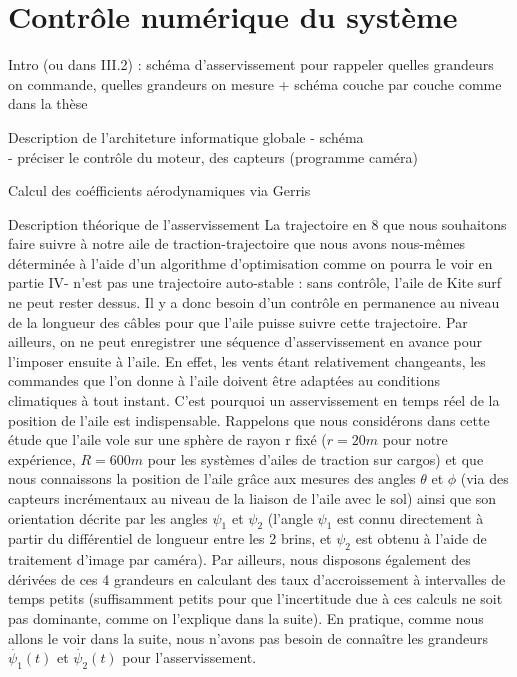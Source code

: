 \documentclass[a4paper,twoside,12pt]{article}
\newcounter{partie}
\newcounter{sous-partie}
\newenvironment{partie}[1]
{
\section{#1}
}
{

}
\newenvironment{sous-partie}[1]
{
\subsection{#1}
}
{

}
\begin{document}
\begin{partie}{Contrôle numérique du système}
Intro (ou dans III.2) : schéma d'asservissement pour rappeler quelles grandeurs on commande, quelles grandeurs on mesure + schéma couche par  couche comme dans la thèse

\begin{sous-partie}{Description de l'architeture informatique globale}
- schéma
\\
- préciser le contrôle du moteur, des capteurs (programme caméra)
\end{sous-partie}
\begin{sous-partie}{Calcul des coéfficients aérodynamiques via Gerris}

\end{sous-partie}

\begin{sous-partie}{Description théorique de l'asservissement}
La trajectoire en 8 que nous souhaitons faire suivre à notre aile de traction-trajectoire que nous avons nous-mêmes déterminée à l'aide d'un algorithme d'optimisation comme on pourra le voir en partie IV- n'est pas une trajectoire auto-stable : sans contrôle, l'aile de Kite surf ne peut rester dessus. Il y a donc besoin d'un contrôle en permanence au niveau de la longueur des câbles pour que l'aile puisse suivre cette trajectoire. 
\newline
Par ailleurs, on ne peut enregistrer une séquence d'asservissement en avance pour l'imposer ensuite à l'aile. En effet, les vents étant relativement changeants, les commandes que l'on donne à l'aile doivent être adaptées au conditions climatiques à tout instant.
\newline
C'est pourquoi un asservissement en temps réel de la position de l'aile est indispensable.
Rappelons que nous considérons dans cette étude que l'aile vole sur une sphère de rayon r fixé ($r=20m$ pour notre expérience, $R=600 m$ pour les systèmes d'ailes de traction sur cargos) et que nous connaissons la position de l'aile grâce aux mesures des angles $\theta$ et $\phi$ (via des capteurs incrémentaux au niveau de la liaison de l'aile avec le sol) ainsi que son orientation décrite par les angles $\psi_1$ et $\psi_2$ (l'angle  $\psi_1$ est connu directement à partir du différentiel de longueur entre les 2 brins, et $\psi_2$ est obtenu à l'aide de traitement d'image par caméra).
Par ailleurs, nous disposons également des dérivées de ces 4 grandeurs en calculant des taux d'accroissement à intervalles de temps petits (suffisamment petits pour que l'incertitude due à ces calculs ne soit pas dominante, comme on l'explique dans la suite). En pratique, comme nous allons le voir dans la suite, nous n'avons pas besoin de connaître les grandeurs $\dot{\psi_1}(t)$ et $\dot{\psi_2}(t)$ pour l'asservissement.

\end{sous-partie}
\end{partie}
\end{document}
